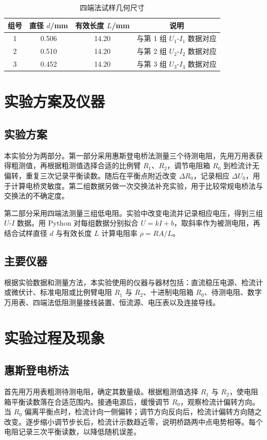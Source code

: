 \documentclass[UTF8,a4paper,12pt]{ctexart}
\begin{document}
\begin{table}[H]
\centering
\caption{四端法试样几何尺寸}
\label{tab:four_geometry}
\begin{tabular}{cccc}
\toprule
组号 & 直径 $d$/mm & 有效长度 $L$/mm & 说明 \\
\midrule
1 & 0.506 & 14.20 & 与第 1 组 $U_1$-$I_1$ 数据对应 \\
2 & 0.510 & 14.20 & 与第 2 组 $U_2$-$I_2$ 数据对应 \\
3 & 0.452 & 14.20 & 与第 3 组 $U_3$-$I_3$ 数据对应 \\
\bottomrule
\end{tabular}
\end{table}

\section{实验方案及仪器}

\subsection{实验方案}
本实验分为两部分。第一部分采用惠斯登电桥法测量三个待测电阻，先用万用表获得粗测值，再根据粗测值选择合适的比例臂 $R_1$、$R_2$，调节电阻箱 $R_0$ 到检流计无偏转，重复三次记录平衡读数。随后在平衡点附近改变 $\Delta R_0$，记录相应 $\Delta U_0$，用于计算电桥灵敏度。第二组数据另做一次交换法补充实验，用于比较常规电桥法与交换法的不确定度。

第二部分采用四端法测量三组低电阻。实验中改变电流并记录相应电压，得到三组 $U$-$I$ 数据。用 Python 对每组数据分别拟合 $U=kI+b$，取斜率作为被测电阻，再结合试样直径 $d$ 与有效长度 $L$ 计算电阻率 $\rho=RA/L$。

\subsection{主要仪器}
根据实验数据和测量方法，本实验使用的仪器与器材包括：直流稳压电源、检流计或微伏计、标准电阻或比例臂电阻 $R_1$ 与 $R_2$、十进制电阻箱 $R_0$、待测电阻、数字万用表、四端法低阻测量接线装置、恒流源、电压表以及连接导线。

\section{实验过程及现象}

\subsection{惠斯登电桥法}
首先用万用表粗测待测电阻，确定其数量级。根据粗测值选择 $R_1$ 与 $R_2$，使电阻箱平衡读数落在合适范围内。接通电源后，缓慢调节 $R_0$，观察检流计偏转方向。当 $R_0$ 偏离平衡点时，检流计向一侧偏转；调节方向反向后，检流计偏转方向随之改变。逐步缩小调节步长后，检流计示数趋近零，说明桥路两中点电势相等。每个电阻记录三次平衡读数，以降低随机误差。
\end{document}
